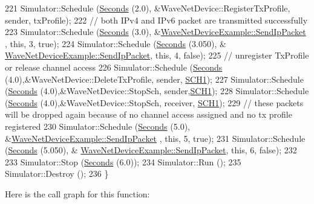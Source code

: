 \begin{DoxyCode}
221   Simulator::Schedule (\hyperlink{group__timecivil_ga33c34b816f8ff6628e33d5c8e9713b9e}{Seconds} (2.0), &WaveNetDevice::RegisterTxProfile, sender, txProfile);
222   \textcolor{comment}{// both IPv4 and IPv6 packet are transmitted successfully}
223   Simulator::Schedule (\hyperlink{group__timecivil_ga33c34b816f8ff6628e33d5c8e9713b9e}{Seconds} (3.0), &\hyperlink{classWaveNetDeviceExample_a555b10fdbbaa27f47dc1f3487e1dcf0d}{WaveNetDeviceExample::SendIpPacket}
      , \textcolor{keyword}{this}, 3, \textcolor{keyword}{true});
224   Simulator::Schedule (\hyperlink{group__timecivil_ga33c34b816f8ff6628e33d5c8e9713b9e}{Seconds} (3.050), &
      \hyperlink{classWaveNetDeviceExample_a555b10fdbbaa27f47dc1f3487e1dcf0d}{WaveNetDeviceExample::SendIpPacket}, \textcolor{keyword}{this}, 4, \textcolor{keyword}{false});
225   \textcolor{comment}{// unregister TxProfile or release channel access}
226   Simulator::Schedule (\hyperlink{group__timecivil_ga33c34b816f8ff6628e33d5c8e9713b9e}{Seconds} (4.0),&WaveNetDevice::DeleteTxProfile, sender,
      \hyperlink{channel-manager_8h_a456a1b730523e5d3b8a29fb227d10028}{SCH1});
227   Simulator::Schedule (\hyperlink{group__timecivil_ga33c34b816f8ff6628e33d5c8e9713b9e}{Seconds} (4.0),&WaveNetDevice::StopSch, sender,\hyperlink{channel-manager_8h_a456a1b730523e5d3b8a29fb227d10028}{SCH1});
228   Simulator::Schedule (\hyperlink{group__timecivil_ga33c34b816f8ff6628e33d5c8e9713b9e}{Seconds} (4.0),&WaveNetDevice::StopSch, receiver, 
      \hyperlink{channel-manager_8h_a456a1b730523e5d3b8a29fb227d10028}{SCH1});
229   \textcolor{comment}{// these packets will be dropped again because of no channel access assigned and no tx profile registered}
230   Simulator::Schedule (\hyperlink{group__timecivil_ga33c34b816f8ff6628e33d5c8e9713b9e}{Seconds} (5.0), &\hyperlink{classWaveNetDeviceExample_a555b10fdbbaa27f47dc1f3487e1dcf0d}{WaveNetDeviceExample::SendIpPacket}
      , \textcolor{keyword}{this}, 5, \textcolor{keyword}{true});
231   Simulator::Schedule (\hyperlink{group__timecivil_ga33c34b816f8ff6628e33d5c8e9713b9e}{Seconds} (5.050), &
      \hyperlink{classWaveNetDeviceExample_a555b10fdbbaa27f47dc1f3487e1dcf0d}{WaveNetDeviceExample::SendIpPacket}, \textcolor{keyword}{this}, 6, \textcolor{keyword}{false});
232 
233   Simulator::Stop (\hyperlink{group__timecivil_ga33c34b816f8ff6628e33d5c8e9713b9e}{Seconds} (6.0));
234   Simulator::Run ();
235   Simulator::Destroy ();
236 \}
\end{DoxyCode}


Here is the call graph for this function\+:


